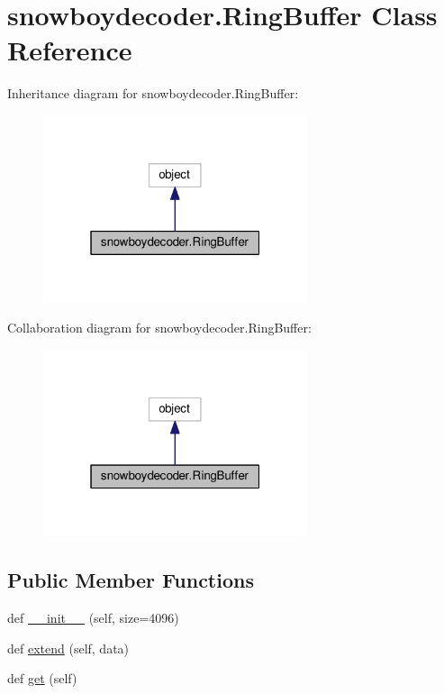 \hypertarget{classsnowboydecoder_1_1RingBuffer}{}\section{snowboydecoder.\+Ring\+Buffer Class Reference}
\label{classsnowboydecoder_1_1RingBuffer}


Inheritance diagram for snowboydecoder.\+Ring\+Buffer\+:
\nopagebreak
\begin{figure}[H]
\begin{center}
\leavevmode
\includegraphics[width=220pt]{classsnowboydecoder_1_1RingBuffer__inherit__graph}
\end{center}
\end{figure}


Collaboration diagram for snowboydecoder.\+Ring\+Buffer\+:
\nopagebreak
\begin{figure}[H]
\begin{center}
\leavevmode
\includegraphics[width=220pt]{classsnowboydecoder_1_1RingBuffer__coll__graph}
\end{center}
\end{figure}
\subsection*{Public Member Functions}
\begin{DoxyCompactItemize}
\item 
def \hyperlink{classsnowboydecoder_1_1RingBuffer_a0e81257f8756886d0fbfb195ccd5b681}{\+\_\+\+\_\+init\+\_\+\+\_\+} (self, size=4096)
\item 
def \hyperlink{classsnowboydecoder_1_1RingBuffer_a8abd8bc5da6f36309861332258669790}{extend} (self, data)
\item 
def \hyperlink{classsnowboydecoder_1_1RingBuffer_ad083eb25f13fa3d7947caf62ca0d7353}{get} (self)
\end{DoxyCompactItemize}


